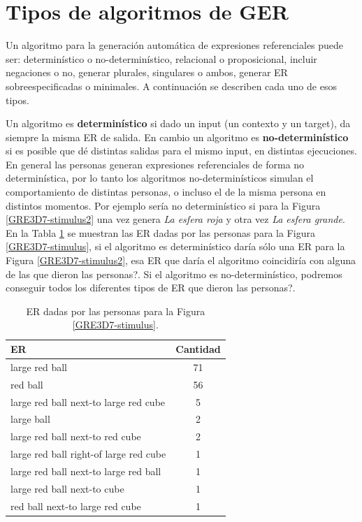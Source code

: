 \section{Tipos de algoritmos de GER}
\label{sec:tipos_algoritmos}
Un algoritmo para la generaci\'on autom\'atica de expresiones referenciales  puede ser: determin\'{i}stico o no-determin\'{i}stico, relacional o proposicional, incluir negaciones o no, generar plurales, singulares o ambos,
generar ER sobreespecificadas o minimales.  A continuaci\'on se describen cada uno de esos tipos.

Un algoritmo es {\bf determin\'{i}stico} si dado un input (un contexto y un target), da siempre la misma ER de salida. En cambio un algoritmo es {\bf no-determin\'{i}stico} si es posible que d\'e distintas salidas para el mismo input, en distintas ejecuciones. En general las personas generan expresiones referenciales de forma no determin\'istica, por lo tanto los algoritmos no-determin\'isticos simulan el comportamiento de distintas personas, o incluso el de la misma persona en distintos momentos. Por ejemplo ser\'ia no determin\'istico si para la Figura \ref{GRE3D7-stimulus2} una vez genera {\it La esfera roja} y otra vez {\it La esfera grande}. En la Tabla \ref{er-gre3d7-stimulus} se muestran las ER dadas por las personas para la Figura \ref{GRE3D7-stimulus}, si el algoritmo es determin\'istico dar\'ia s\'olo una ER para la Figura \ref{GRE3D7-stimulus2}, esa ER que dar\'ia el algoritmo coincidir\'ia con alguna de las que dieron las personas?. Si el algoritmo es no-determin\'istico, podremos conseguir todos los diferentes tipos de ER que dieron las personas?.


\begin{table}[h!]
\begin{center}
\begin{tabular}{|l|c|}
\hline
 ER& Cantidad \\
\hline
large red ball & 71 \\
red ball & 56 \\ 
large red ball next-to large red cube & 5 \\ 
large ball & 2 \\ 
large red ball next-to red cube & 2 \\ 
large red ball right-of large red cube & 1 \\ 
large red ball next-to large red ball & 1 \\ 
large red ball next-to cube & 1 \\ 
red ball next-to large red cube & 1 \\ \hline
\end{tabular}
\caption{ER dadas por las personas para la Figura \ref{GRE3D7-stimulus}.} 
\label{er-gre3d7-stimulus}
\vspace*{-.5cm}
\end{center}
\end{table}

